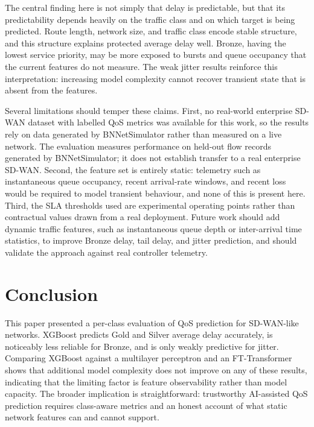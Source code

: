 \documentclass[conference]{IEEEtran}
\begin{document}
The central finding here is not simply that delay is predictable, but that its predictability depends heavily on the traffic class and on which target is being predicted. Route length, network size, and traffic class encode stable structure, and this structure explains protected average delay well. Bronze, having the lowest service priority, may be more exposed to bursts and queue occupancy that the current features do not measure. The weak jitter results reinforce this interpretation: increasing model complexity cannot recover transient state that is absent from the features.

Several limitations should temper these claims. First, no real-world enterprise SD-WAN dataset with labelled QoS metrics was available for this work, so the results rely on data generated by BNNetSimulator rather than measured on a live network. The evaluation measures performance on held-out flow records generated by BNNetSimulator; it does not establish transfer to a real enterprise SD-WAN. Second, the feature set is entirely static: telemetry such as instantaneous queue occupancy, recent arrival-rate windows, and recent loss would be required to model transient behaviour, and none of this is present here. Third, the SLA thresholds used are experimental operating points rather than contractual values drawn from a real deployment. Future work should add dynamic traffic features, such as instantaneous queue depth or inter-arrival time statistics, to improve Bronze delay, tail delay, and jitter prediction, and should validate the approach against real controller telemetry.

\section{Conclusion}

This paper presented a per-class evaluation of QoS prediction for SD-WAN-like networks. XGBoost predicts Gold and Silver average delay accurately, is noticeably less reliable for Bronze, and is only weakly predictive for jitter. Comparing XGBoost against a multilayer perceptron and an FT-Transformer shows that additional model complexity does not improve on any of these results, indicating that the limiting factor is feature observability rather than model capacity. The broader implication is straightforward: trustworthy AI-assisted QoS prediction requires class-aware metrics and an honest account of what static network features can and cannot support.



\end{document}
